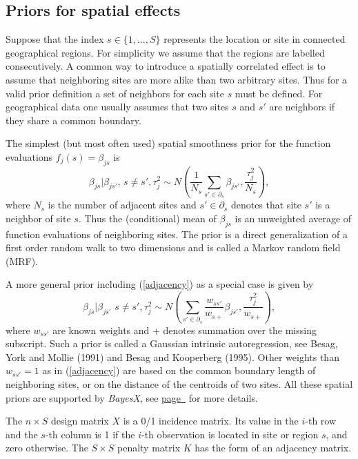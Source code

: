\subsection{Priors for spatial effects}
\label{spatial}

Suppose that the index $s \in \{ 1,\dots,S \}$ represents the
location or site in connected geographical regions. For simplicity
we assume that the regions are labelled consecutively. A common
way to introduce a spatially correlated effect is to assume that
neighboring sites are more alike than two arbitrary sites. Thus
for a valid prior definition a set of neighbors for each site $s$
must be defined. For geographical data one usually assumes that
two sites $s$ and $s'$ are neighbors if they share a common
boundary.

The simplest (but most often used) spatial smoothness prior for
the function evaluations $f_j(s)=\beta_{js}$ is
\begin{equation}
\label{adjacency} \beta_{js} | \beta_{js'}, \, {s \neq
s'},\tau_j^2 \sim N \left( \frac{1}{N_s} \sum_{s' \in \partial_s}
\beta_{js'} , \frac{\tau_j^2}{N_s} \right),
\end{equation}
where $N_s$ is the number of adjacent sites and $s' \in
\partial_s$ denotes that site $s'$ is a neighbor of site $s$. Thus
the (conditional) mean of $\beta_{js}$ is an unweighted average of
function evaluations of neighboring sites. The prior is a direct
generalization of a first order random walk to two dimensions and
is called a Markov random field (MRF).

A more general prior including (\ref{adjacency}) as a special case
is given by
\begin{equation}
\label{intrinsic} \beta_{js} | \beta_{js'} \, \, {s \neq
s'},\tau_j^2 \sim N \left( \sum_{s' \in \partial_s}
\frac{w_{ss'}}{w_{s+}} \beta_{js'}, \frac{\tau_j^2}{w_{s+}} \right),
\end{equation}
where $w_{ss'}$ are known weights and $+$ denotes summation over
the missing subscript. Such a prior is called a Gaussian intrinsic
autoregression, see Besag, York and Mollie (1991) and Besag and
Kooperberg (1995). Other weights than $w_{ss'} = 1$ as in
(\ref{adjacency}) are based on the common boundary length of
neighboring sites, or on the distance of the centroids of two
sites. All these spatial priors are supported by {\em BayesX}, see
\hyperref[weightsmap]{page~\pageref*{weightsmap}} for more
details.

The $n \times S$ design matrix $X$ is a 0/1 incidence matrix. Its
value in the $i$-th row and the $s$-th column is 1 if the $i$-th
observation is located in site or region $s$, and zero otherwise.
The $S \times S$ penalty matrix $K$ has the form of an adjacency
matrix.

